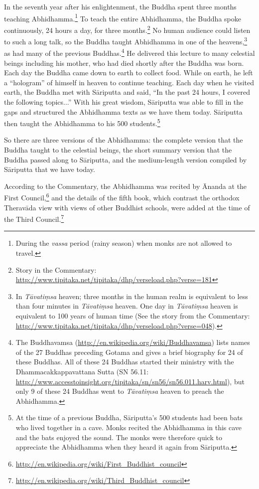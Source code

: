 In the seventh year after his enlightenment, the Buddha spent three months teaching Abhidhamma.\footnote{During the \textit{vassa} period (rainy season) when monks are not allowed to travel.} To teach the entire Abhidhamma, the Buddha spoke continuously, 24 hours a day, for three months.\footnote{Story in the Commentary: \url{http://www.tipitaka.net/tipitaka/dhp/verseload.php?verse=181}} No human audience could listen to such a long talk, so the Buddha taught Abhidhamma in one of the heavens,\footnote{In \textit{Tāvatiṃsa} heaven; three months in the human realm is equivalent to less than four minutes in \textit{Tāvatiṃsa} heaven. One day in \textit{Tāvatiṃsa} heaven is equivalent to 100 years of human time (See the story from the Commentary: \url{http://www.tipitaka.net/tipitaka/dhp/verseload.php?verse=048}).} as had many of the previous Buddhas.\footnote{The Buddhavamsa (\url{http://en.wikipedia.org/wiki/Buddhavamsa}) lists names of the 27 Buddhas preceding Gotama and gives a brief biography for 24 of these Buddhas. All of these 24 Buddhas started their ministry with the Dhammacakkappavattana Sutta (SN 56.11: \url{http://www.accesstoinsight.org/tipitaka/sn/sn56/sn56.011.harv.html}), but only 9 of these 24 Buddhas went to \textit{Tāvatiṃsa} heaven to preach the Abhidhamma.} He delivered this lecture to many celestial beings including his mother, who had died shortly after the Buddha was born. Each day the Buddha came down to earth to collect food. While on earth, he left a “hologram” of himself in heaven to continue teaching. Each day when he visited earth, the Buddha met with Sāriputta and said, “In the past 24 hours, I covered the following topics...” With his great wisdom, Sāriputta was able to fill in the gaps and structured the Abhidhamma texts as we have them today. Sāriputta then taught the Abhidhamma to his 500 students.\footnote{At the time of a previous Buddha, Sāriputta’s 500 students had been bats who lived together in a cave. Monks recited the Abhidhamma in this cave and the bats enjoyed the sound. The monks were therefore quick to appreciate the Abhidhamma when they heard it again from Sāriputta.}

So there are three versions of the Abhidhamma: the complete version that the Buddha taught to the celestial beings, the short summary version that the Buddha passed along to Sāriputta, and the medium-length version compiled by Sāriputta that we have today. 

According to the Commentary, the Abhidhamma was recited by Ānanda at the First Council,\footnote{\url{http://en.wikipedia.org/wiki/First_Buddhist_council}} and the details of the fifth book, which contrast the orthodox Theravāda view with views of other Buddhist schools, were added at the time of the Third Council.\footnote{\url{http://en.wikipedia.org/wiki/Third_Buddhist_council}}

